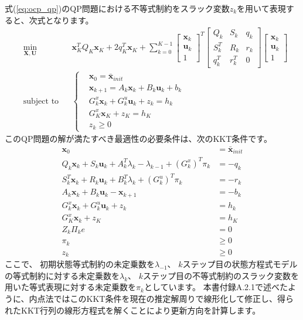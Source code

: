 \documentclass[a4paper]{jarticle}
\begin{document}
式(\ref{eq:ocp_qp})のQP問題における不等式制約をスラック変数$z_k$を用いて表現すると、次式となります。
\begin{equation*}
\begin{aligned}
& \underset{ \mathbf{X},\mathbf{U}}{\text{min}} && 
\mathbf{x}_K^TQ_K\mathbf{x}_K + 2 q_K^T\mathbf{x}_K
+
\sum_{k=0}^{K-1}
\begin{bmatrix} \mathbf{x}_k \\ \mathbf{u}_k \\ 1\end{bmatrix}^T
\begin{bmatrix} Q_k & S_k & q_k \\ S_k^T & R_k & r_k \\ q_k^T & r_k^T & 0\end{bmatrix}
\begin{bmatrix} \mathbf{x}_k \\ \mathbf{u}_k \\ 1\end{bmatrix} \\
&\text{subject to} && \left \{
\begin{aligned}
    & \mathbf{x}_0 = \bar{\mathbf{x}}_{init}\\
    & \mathbf{x}_{k+1} = A_k \mathbf{x}_k + B_k \mathbf{u}_k + b_k\\
    & G^{x}_k \mathbf{x}_k + G^{u}_k\mathbf{u}_k + z_k =h_k\\
    & G^{x}_K\mathbf{x}_K + z_K = h_K\\
    & z_k \ge 0
\end{aligned}
\right .
\end{aligned}
\end{equation*}
このQP問題の解が満たすべき最適性の必要条件は、次のKKT条件です。
\begin{align*}
\mathbf{x}_0 &= \bar{\mathbf{x}}_{init}
\\
Q_k \mathbf{x}_k + S_k \mathbf{u}_k + A_k^T\lambda_k - \lambda_{k-1} + (G_k^x)^T\pi_k &= -q_k
\\
S_k^T\mathbf{x}_k + R_k \mathbf{u}_k + B_k^T\lambda_k + (G_k^u)^T\pi_k &= - r_k
\\
A_k \mathbf{x}_k + B_k \mathbf{u}_k  - \mathbf{x}_{k+1} &= - b_k
\\
G_k^x\mathbf{x}_k + {G_k^u}\mathbf{u}_k + z_k &= h_k
\\
G_K^x\mathbf{x}_k+ z_K &= h_K
\\
Z_k\Pi_ke &=0
\\
\pi_k &\ge0\\
z_k &\ge 0
\end{align*}
ここで、
初期状態等式制約の未定乗数を$\lambda_{-1}$、
$k$ステップ目の状態方程式モデルの等式制約に対する未定乗数を$\lambda_{k}$、
$k$ステップ目の不等式制約のスラック変数を用いた等式表現に対する未定乗数を$\pi_k$としています。
本書\cite{fukatsu2024python}付録A.2.1で述べたように、内点法ではこのKKT条件を現在の推定解周りで線形化して修正し、得られたKKT行列の線形方程式を解くことにより更新方向を計算します。
\end{document}
